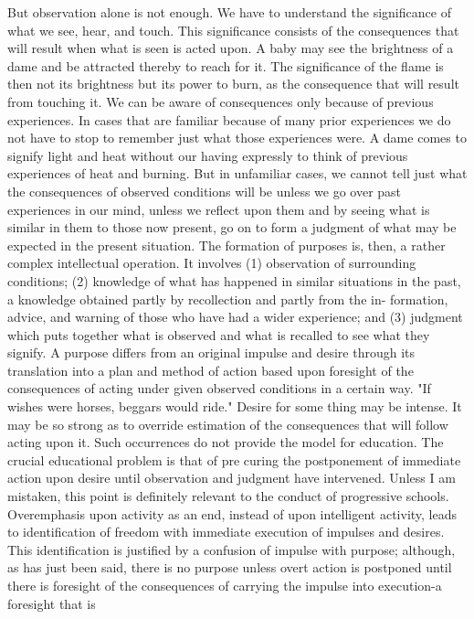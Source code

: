But observation alone is not enough. We have to understand the significance of what 
we see, hear, and touch. This significance consists of the consequences that will result 
when what is seen is acted upon. A baby may see the brightness of a dame and be 
attracted thereby to reach for it. The significance of the flame is then not its brightness 
but its power to burn, as the consequence that will result from touching it. We can be 
aware of consequences only because of previous experiences. In cases that are familiar 
because of many prior experiences we do not have to stop to remember just what those 
experiences were. A dame comes to signify light and heat without our having expressly 
to think of previous experiences of heat and burning. But in unfamiliar cases, we cannot 
tell just what the consequences of observed conditions will be unless we go over past 
experiences in our mind, unless we reflect upon them and by seeing what is similar in 
them to those now present, go on to form a judgment of what may be expected in the 
present situation. The formation of purposes is, then, a rather complex intellectual 
operation. It involves (1) observation of surrounding conditions; (2) knowledge of what 
has happened in similar situations in the past, a knowledge obtained partly by recollection 
and partly from the in- formation, advice, and warning of those who have had a wider 
experience; and (3) judgment which puts together what is observed and what is recalled 
to see what they signify. A purpose differs from an original impulse and desire through 
its translation into a plan and method of action based upon foresight of the consequences 
of acting under given observed conditions in a certain way. "If wishes were horses, 
beggars would ride." Desire for some thing may be intense. It may be so strong as to 
override estimation of the consequences that will follow acting upon it. Such occurrences 
do not provide the model for education. The crucial educational problem is that of pre 
curing the postponement of immediate action upon desire until observation and judgment 
have intervened. Unless I am mistaken, this point is definitely relevant to the conduct of 
progressive schools. Overemphasis upon activity as an end, instead of upon intelligent 
activity, leads to identification of freedom with immediate execution of impulses and 
desires. This identification is justified by a confusion of impulse with purpose; although, 
as has just been said, there is no purpose unless overt action is postponed until there is 
foresight of the consequences of carrying the impulse into execution-a foresight that is 
